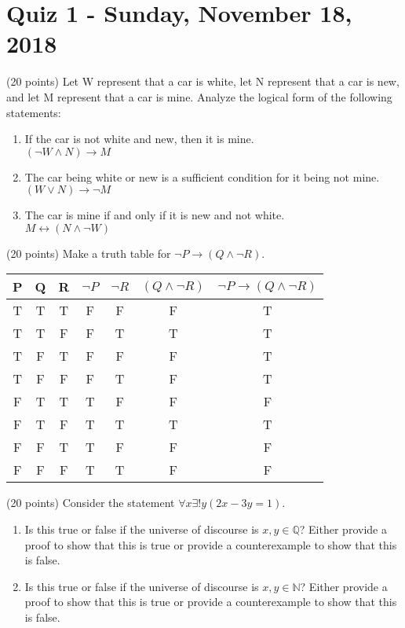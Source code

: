 \chapter{Quiz 1 - Sunday, November 18, 2018}
\begin{prob}
(20 points) Let W represent that a car is white, let N represent that a car is new, and let M represent that a car is mine. Analyze the logical form of the following statements:
\begin{enumerate}
\item If the car is not white and new, then it is mine. \\
$ ( \neg W \wedge N ) \rightarrow M $
\item The car being white or new is a sufficient condition for it being not mine. \\
$ (W \vee N ) \rightarrow \neg M $
\item The car is mine if and only if it is new and not white. \\
$ M \leftrightarrow ( N \wedge \neg W )$
\end{enumerate}
\end{prob}
\begin{prob}
(20 points) Make a truth table for $ \neg P \rightarrow (Q \wedge \neg R)$.
\begin{center}
 \begin{tabular}{|c|c|c|c|c|c|c|} 
 \hline
P & Q & R & $ \neg P $ & $ \neg R$ & $ ( Q \wedge \neg R ) $ & $ \neg P \rightarrow (Q \wedge \neg R)$ \\
 \hline
T & T & T & F & F & F & T \\
T & T & F & F & T & T & T \\
T & F & T & F & F & F & T \\
T & F & F & F & T & F & T \\
F & T & T & T & F & F & F \\
F & T & F & T & T & T & T \\
F & F & T & T & F & F & F \\
F & F & F & T & T & F & F\\
 \hline
\end{tabular}
\end{center}
\end{prob}
\begin{prob}
(20 points) Consider the statement $ \forall x \exists ! y (2x - 3y = 1) $.
\begin{enumerate}
\item Is this true or false if the universe of discourse is $ x, y \in \mathbb{Q} $? Either provide a proof to show that this is true or provide a counterexample to show that this is false.
\item Is this true or false if the universe of discourse is $ x, y \in \mathbb{N} $? Either provide a proof to show that this is true or provide a counterexample to show that this is false.
\end{enumerate}
\end{prob}
